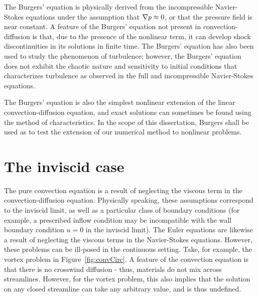 The Burgers' equation is physically derived from the incompressible Navier-Stokes equations under the assumption that $\grad p \approx 0$, or that the pressure field is near constant. A feature of the Burgers' equation not present in convection-diffusion is that, due to the presence of the nonlinear term, it can develop shock discontinuities in its solutions in finite time.  The Burgers' equation has also been used to study the phenomenon of turbulence; however, the Burgers' equation does not exhibit the chaotic nature and sensitivity to initial conditions that characterizes turbulence as observed in the full and incompressible Navier-Stokes equations. 

The Burgers' equation is also the simplest nonlinear extension of the linear convection-diffusion equation, and exact solutions can sometimes be found using the method of characteristics. In the scope of this dissertation, Burgers shall be used as to test the extension of our numerical method to nonlinear problems. 

\section{The inviscid case}

The pure convection equation is a result of neglecting the viscous term in the convection-diffusion equation. Physically speaking, these assumptions correspond to the inviscid limit, as well as a particular class of boundary conditions (for example, a prescribed inflow condition may be incompatible with the wall boundary condition $u = 0$ in the inviscid limit).  The Euler equations are likewise a result of neglecting the viscous terms in the Navier-Stokes equations.  However, these problems can be ill-posed in the continuous setting.  Take, for example, the vortex problem in Figure~\ref{fig:convCirc}.  A feature of the convection equation is that there is no crosswind diffusion - thus, materials do not mix across streamlines.  However, for the vortex problem, this also implies that the solution on any closed streamline can take any arbitrary value, and is thus undefined. 

